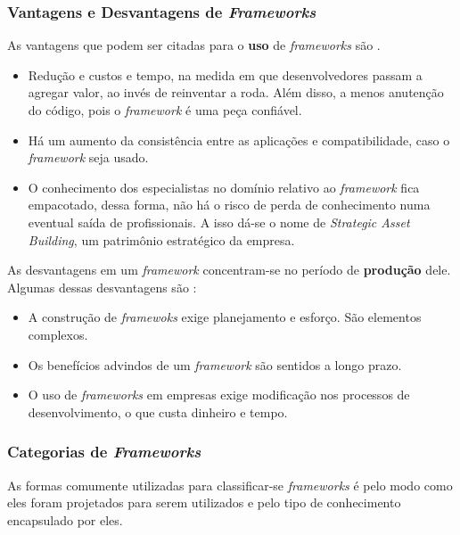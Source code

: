 \subsubsection{Vantagens e Desvantagens de \textit{Frameworks}}
As vantagens que podem ser citadas para o \textbf{uso} de \textit{frameworks} são \cite{barretoJunior2006} \cite{sauve2006}.
\begin{itemize}
\item Redução e custos e tempo, na medida em que desenvolvedores passam a agregar valor, ao invés de reinventar a roda. Além disso, a menos anutenção do código, pois o \textit{framework} é uma peça confiável.
\item Há um aumento da consistência entre as aplicações e compatibilidade, caso o \textit{framework} seja usado.
\item O conhecimento dos especialistas no domínio relativo ao \textit{framework} fica empacotado, dessa forma, não há o risco de perda de conhecimento numa eventual saída de profissionais. A isso dá-se o nome de \textit{Strategic Asset Building}, um patrimônio estratégico da empresa.
\end{itemize}

As desvantagens em um \textit{framework} concentram-se no período de \textbf{produção} dele. Algumas dessas desvantagens são \cite{barretoJunior2006} \cite{sauve2006}:
\begin{itemize}
\item A construção de \textit{framewoks} exige planejamento e esforço. São elementos complexos.
\item Os benefícios advindos de um \textit{framework} são sentidos a longo prazo.
\item O uso de \textit{frameworks} em empresas exige modificação nos processos de desenvolvimento, o que custa dinheiro e tempo.
\end{itemize}
\par

\subsubsection{Categorias de \textit{Frameworks}}
As formas comumente utilizadas para classificar-se \textit{frameworks} é pelo modo como eles foram projetados para serem utilizados e pelo tipo de conhecimento encapsulado por eles.

